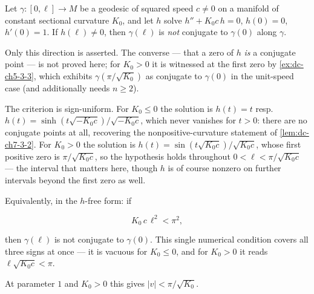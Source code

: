 \begin{lemma}
  \label{lem:dc-ch8-2-1-no-conjugate}


  Let $\gamma:[0,\ell]\to M$ be a geodesic of squared speed $c\neq0$ on a manifold of constant
  sectional curvature $K_0$, and let $h$ solve $h''+K_0c\,h=0$, $h(0)=0$, $h'(0)=1$. If
  $h(\ell)\neq0$, then $\gamma(\ell)$ is \emph{not} conjugate to $\gamma(0)$ along $\gamma$.

  Only this direction is asserted. The converse --- that a zero of $h$ \emph{is} a conjugate
  point --- is not proved here; for $K_0>0$ it is witnessed at the first zero by
  \cref{ex:dc-ch5-3-3}, which exhibits $\gamma(\pi/\sqrt{K_0})$ as conjugate to $\gamma(0)$ in
  the unit-speed case (and additionally needs $n\geq2$).

  The criterion is sign-uniform. For $K_0\leq0$ the solution is $h(t)=t$ resp.
  $h(t)=\sinh(t\sqrt{-K_0c})/\sqrt{-K_0c}$, which never vanishes for $t>0$: there are no
  conjugate points at all, recovering the nonpositive-curvature statement of
  \cref{lem:dc-ch7-3-2}. For $K_0>0$ the solution is $h(t)=\sin(t\sqrt{K_0c})/\sqrt{K_0c}$,
  whose first positive zero is $\pi/\sqrt{K_0c}$, so the hypothesis holds throughout
  $0<\ell<\pi/\sqrt{K_0c}$ --- the interval that matters here, though $h$ is of course nonzero
  on further intervals beyond the first zero as well.

  Equivalently, in the $h$-free form: if

  $$
  K_0\,c\,\ell^2 < \pi^2,
  $$

  then $\gamma(\ell)$ is not conjugate to $\gamma(0)$. This single numerical condition covers
  all three signs at once --- it is vacuous for $K_0\leq0$, and for $K_0>0$ it reads
  $\ell\sqrt{K_0c}<\pi$.

  At parameter $1$ and $K_0>0$ this gives $|v|<\pi/\sqrt{K_0}$.
\end{lemma}

